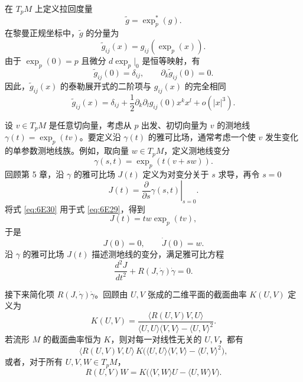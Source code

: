 在 $T_pM$ 上定义拉回度量
\[
  \widetilde g=\exp_p^*(g).
\]
在黎曼正规坐标中，$\widetilde g$ 的分量为
\[
  \widetilde g_{ij}(x)=g_{ij}(\exp_p(x)).
\]
由于 $\exp_p(0)=p$ 且微分 $d\exp_p|_0$ 是恒等映射，有
\[
  \widetilde g_{ij}(0)=\delta_{ij},\qquad \partial_k\widetilde g_{ij}(0)=0.
\]
因此，$\widetilde g_{ij}(x)$ 的泰勒展开式的二阶项与 $g_{ij}(x)$ 的完全相同
\begin{equation*}
  \widetilde g_{ij}(x)=\delta_{ij}+\frac12\partial_k\partial_lg_{ij}(0)x^kx^l+o(|x|^3).
  \tag{6E28}\label{eq:6E28}
\end{equation*}

设 $v\in T_pM$ 是任意切向量，考虑从 $p$ 出发、初切向量为 $v$ 的测地线 $\gamma(t)=\exp_p(tv)$。要定义沿 $\gamma(t)$ 的雅可比场，通常考虑一个使 $v$ 发生变化的单参数测地线族。例如，取向量 $w\in T_pM$，定义测地线变分
\begin{equation*}
  \gamma(s,t)=\exp_p(t(v+sw)).
  \tag{6E29}\label{eq:6E29}
\end{equation*}
回顾第 5 章，沿 $\gamma$ 的雅可比场 $J(t)$ 定义为对变分关于 $s$ 求导，再令 $s=0$
\begin{equation*}
  J(t)=\left.\frac{\partial}{\partial s}\gamma(s,t)\right|_{s=0}.
  \tag{6E30}\label{eq:6E30}
\end{equation*}
将式 \eqref{eq:6E30} 用于式 \eqref{eq:6E29}，得到%
%
\begin{equation*}
  J(t)=tw\exp_p(tv),
  \tag{6E31}\label{eq:6E31}
\end{equation*}
于是
\[
  J(0)=0,\qquad \dot J(0)=w.
\]
沿 $\gamma$ 的雅可比场 $J(t)$ 描述测地线的变分，满足雅可比方程%
%
\begin{equation*}
  \frac{d^2J}{dt^2}+R(J,\dot\gamma)\dot\gamma=0.
  \tag{6E32}\label{eq:6E32}
\end{equation*}

接下来简化项 $R(J,\dot\gamma)\dot\gamma$。回顾由 $U,V$ 张成的二维平面的截面曲率 $K(U,V)$ 定义为
\begin{equation*}
  K(U,V)=\frac{\langle R(U,V)V,U\rangle}
  {\langle U,U\rangle\langle V,V\rangle-\langle U,V\rangle^2}.
  \tag{6E33}\label{eq:6E33}
\end{equation*}
若流形 $M$ 的截面曲率恒为 $K$，则对每一对线性无关的 $U,V$，都有%
%
\begin{equation*}
  \langle R(U,V)V,U\rangle\,K
    \bigl(\langle U,U\rangle\langle V,V\rangle-\langle U,V\rangle^2\bigr),
  \tag{6E34}\label{eq:6E34}
\end{equation*}
或者，对于所有 $U,V,W\in T_pM$，
\begin{equation*}
  R(U,V)W=K\bigl(\langle V,W\rangle U-\langle U,W\rangle V\bigr).
  \tag{6E35}\label{eq:6E35}
\end{equation*}

